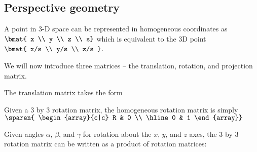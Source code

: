 \documentclass[12pt]{article}
\begin{document}
\subsection{Perspective geometry}

A point in 3-D space can be represented in homogeneous coordinates as $\bmat{ x \\ y \\ z \\ s}$ which is equivalent to the 3D point $\bmat{ x/s \\ y/s \\ z/s }$.

We will now introduce three matrices -- the translation, rotation, and projection matrix.

The translation matrix takes the form


Given a 3 by 3 rotation matrix, the homogeneous rotation matrix is simply $\sparen{ \begin{array}{c|c} R & 0 \\ \hline 0 & 1 \end{array}}$

Given angles $\alpha$, $\beta$, and $\gamma$ for rotation about the $x$, $y$, and $z$ axes, the 3 by 3 rotation matrix can be written as a product of rotation matrices:

\end{document}
